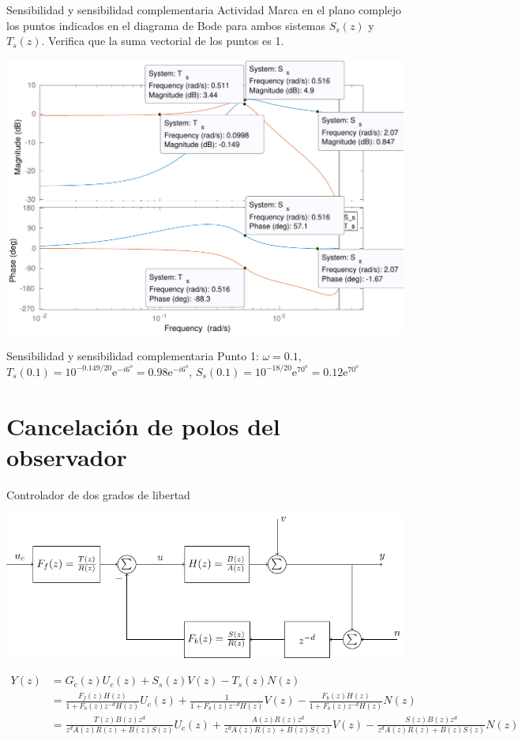 \documentclass[presentation,aspectratio=169]{beamer}
\begin{document}
\begin{frame}[label={sec:org7a08942}]{Sensibilidad y sensibilidad complementaria}
\alert{Actividad} Marca en el plano complejo los puntos indicados en el diagrama de Bode para ambos sistemas \(S_s(z)\) y \(T_s(z)\). Verifica que la suma vectorial de los puntos es 1.
\begin{center}
\includegraphics[width=0.7\linewidth]{../matlab/bode-sensitivity-exercise-crop}
\end{center}
\end{frame}

\begin{frame}[label={sec:orgf849b35}]{Sensibilidad y sensibilidad complementaria}
Punto 1: \(\omega=0.1\), \(T_s(0.1) = 10^{-0.149/20}\mathrm{e}^{-i6^o} = 0.98\mathrm{e}^{-i6^o}\), \(S_s(0.1) = 10^{-18/20}\mathrm{e}^{70^o} = 0.12\mathrm{e}^{70^o}\)
\end{frame}

\section{Cancelación de polos del observador}
\label{sec:org904c8e4}
\begin{frame}[label={sec:org20b5a5b}]{Controlador de dos grados de libertad}
\begin{center}
\includegraphics[width=0.8\linewidth]{../../figures/2dof-block-explicit}
\end{center}

\begin{align*}
Y(z) &= G_c(z)U_c(z) + S_s(z)V(z) - T_s(z)N(z)\\
     &= \frac{F_f(z)H(z)}{1 + F_b(z)z^{-d}H(z)}U_c(z) + \frac{1}{1 + F_b(z)z^{-d}H(z)}V(z)  - \frac{F_b(z)H(z)}{1 + F_b(z)z^{-d}H(z)}N(z)\\
     &= \frac{T(z)B(z)z^d}{z^dA(z)R(z) + B(z)S(z)}U_c(z) + \frac{A(z)R(z)z^d}{z^dA(z)R(z) + B(z)S(z)}V(z) - \frac{S(z)B(z)z^d}{z^dA(z)R(z) + B(z)S(z)}N(z)
\end{align*}
\end{frame}
\end{document}
